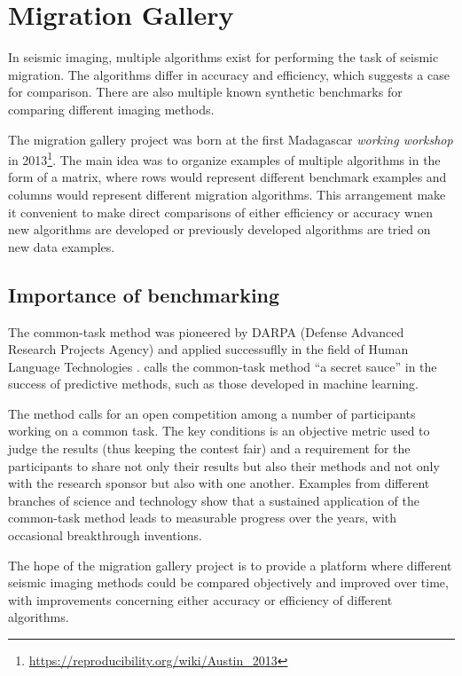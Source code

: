 \chapter{Migration Gallery}

In seismic imaging, multiple algorithms exist for performing the task
of seismic migration. The algorithms differ in accuracy and
efficiency, which suggests a case for comparison. There are also
multiple known synthetic benchmarks for comparing different imaging methods.

The migration gallery project was born at the first Madagascar
\emph{working workshop} in
2013\footnote{\url{https://reproducibility.org/wiki/Austin_2013}}. The
main idea was to organize examples of multiple algorithms in the form
of a matrix, where rows would represent different benchmark examples
and columns would represent different migration algorithms. This
arrangement make it convenient to make direct comparisons of either
efficiency or accuracy wnen new algorithms are developed or previously
developed algorithms are tried on new data examples.

\section{Importance of benchmarking}

The common-task method was pioneered by DARPA (Defense Advanced
Research Projects Agency) and applied successuflly in the field of
Human Language Technologies \cite[]{liberman2020human}. \cite{donoho}
calls the common-task method ``a secret sauce'' in the success of
predictive methods, such as those developed in machine learning.

The method calls for an open competition among a number of
participants working on a common task. The key conditions is an
objective metric used to judge the results (thus keeping the contest
fair) and a requirement for the participants to share not only their
results but also their methods and not only with the research sponsor
but also with one another. Examples from different branches of science
and technology show that a sustained application of the common-task
method leads to measurable progress over the years, with occasional
breakthrough inventions.

The hope of the migration gallery project is to provide a platform
where different seismic imaging methods could be compared objectively
and improved over time, with improvements concerning either accuracy
or efficiency of different algorithms.

